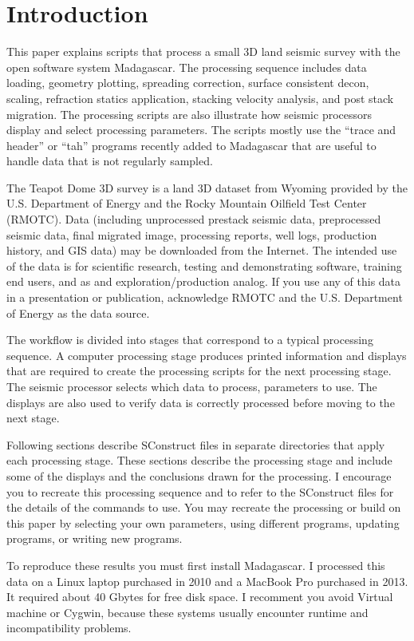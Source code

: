 \section{Introduction}
This paper explains scripts that process a small 3D land seismic survey with the open software system Madagascar.  The processing sequence includes data loading, geometry plotting, spreading correction, surface consistent decon, scaling, refraction statics application, stacking velocity analysis, and post stack migration.  The processing scripts are also illustrate how seismic processors display and select processing parameters.  The scripts mostly use the “trace and header” or “tah” programs recently added to Madagascar that are useful to handle data that is not regularly sampled. 

The Teapot Dome 3D survey is a land 3D dataset from Wyoming provided by the U.S. Department of Energy and the Rocky Mountain Oilfield Test Center (RMOTC).  Data (including unprocessed prestack seismic data, preprocessed seismic data, final migrated image, processing reports, well logs, production history, and GIS data) may be downloaded from the Internet.    The intended use of the data is for scientific research, testing and demonstrating software, training end users, and as and exploration/production analog.  If you use any of this data in a presentation or publication, acknowledge RMOTC and the U.S. Department of Energy as the data source.

The workflow is divided into stages that correspond to a typical processing sequence.  A computer processing stage produces printed information and displays that are required to create the processing scripts for the next processing stage.  The seismic processor selects which data to process, parameters to use.  The displays are also used to verify data is correctly processed before moving to the next stage.

Following sections describe SConstruct files in separate directories that apply each processing stage.  These sections describe the processing stage and include some of the displays and the conclusions drawn for the processing.  I encourage you to recreate this processing sequence and to refer to the SConstruct files for the details of the commands to use.  You may recreate the processing or build on this paper by selecting your own parameters, using different programs, updating programs, or writing new programs.  

To reproduce these results you must first install Madagascar.  I processed this data on a Linux laptop purchased in 2010 and a MacBook Pro purchased in 2013.  It required about 40 Gbytes for free disk space.  I recomment you avoid Virtual machine or Cygwin, because these systems usually encounter runtime and incompatibility problems.  

